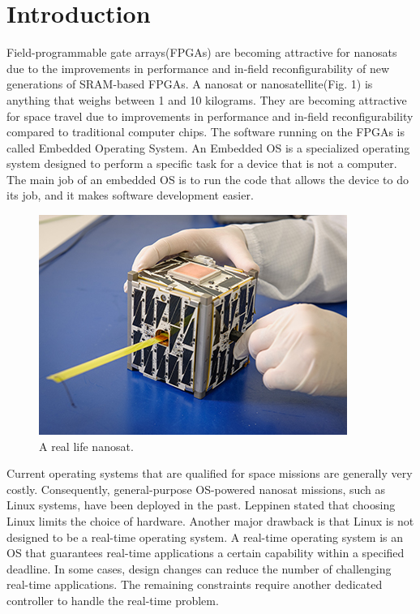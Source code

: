\documentclass[conference]{IEEEtran}
\begin{document}
\section{Introduction}
Field-programmable gate arrays(FPGAs) are becoming attractive for nanosats due to the improvements in 
performance and in-field reconfigurability of new generations of SRAM-based FPGAs. A nanosat or nanosatellite(Fig. 1)
is anything that weighs between 1 and 10 kilograms. They are becoming attractive for space travel due to improvements 
in performance and in-field reconfigurability compared to traditional computer chips.
The software running on the FPGAs is called Embedded Operating System. An Embedded OS is a specialized operating system
designed to perform a specific task for a device that is not a computer. The main job of an embedded OS is to run the 
code that allows the device to do its job, and it makes software development easier. 
\begin{figure}[ht]
    \centering
    \includegraphics[scale = 2.5]{nanosat.jpg}
    \caption{A real life nanosat.}
\end{figure}
Current operating systems that are qualified for space missions are generally very costly. Consequently, general-purpose
OS-powered nanosat missions, such as Linux systems, have been deployed in the past. Leppinen \cite{b1} stated that choosing 
Linux limits the choice of hardware. Another major drawback is that Linux is not designed to be a real-time operating 
system. A real-time operating system is an OS that guarantees real-time applications a certain capability within a specified 
deadline. In some cases, design changes can reduce the number of challenging real-time applications. The remaining constraints 
require another dedicated controller to handle the real-time problem. 

\end{document}
